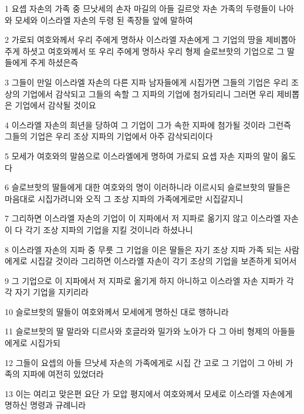 \par 1 요셉 자손의 가족 중 므낫세의 손자 마길의 아들 길르앗 자손 가족의 두령들이 나아와 모세와 이스라엘 자손의 두령 된 족장들 앞에 말하여
\par 2 가로되 여호와께서 우리 주에게 명하사 이스라엘 자손에게 그 기업의 땅을 제비뽑아 주게 하셧고 여호와께서 또 우리 주에게 명하사 우리 형제 슬로브핫의 기업으로 그 딸들에게 주게 하셨은즉
\par 3 그들이 만일 이스라엘 자손의 다른 지파 남자들에게 시집가면 그들의 기업은 우리 조상의 기업에서 감삭되고 그들의 속할 그 지파의 기업에 첨가되리니 그러면 우리 제비뽑은 기업에서 감삭될 것이요
\par 4 이스라엘 자손의 희년을 당하여 그 기업이 그가 속한 지파에 첨가될 것이라 그런즉 그들의 기업은 우리 조상 지파의 기업에서 아주 감삭되리이다
\par 5 모세가 여호와의 말씀으로 이스라엘에게 명하여 가로되 요셉 자손 지파의 말이 옳도다
\par 6 슬로브핫의 딸들에게 대한 여호와의 명이 이러하니라 이르시되 슬로브핫의 딸들은 마음대로 시집가려니와 오직 그 조상 지파의 가족에게로만 시집갈지니
\par 7 그리하면 이스라엘 자손의 기업이 이 지파에서 저 지파로 옮기지 않고 이스라엘 자손이 다 각기 조상 지파의 기업을 지킬 것이니라 하셨나니
\par 8 이스라엘 자손의 지파 중 무릇 그 기업을 이은 딸들은 자기 조상 지파 가족 되는 사람에게로 시집갈 것이라 그리하면 이스라엘 자손이 각기 조상의 기업을 보존하게 되어서
\par 9 그 기업으로 이 지파에서 저 지파로 옮기게 하지 아니하고 이스라엘 자손 지파가 각각 자기 기업을 지키리라
\par 10 슬로브핫의 딸들이 여호와께서 모세에게 명하신 대로 행하니라
\par 11 슬로브핫의 딸 말라와 디르사와 호글라와 밀가와 노아가 다 그 아비 형제의 아들들에게로 시집가되
\par 12 그들이 요셉의 아들 므낫세 자손의 가족에게로 시집 간 고로 그 기업이 그 아비 가족의 지파에 여전히 있었더라
\par 13 이는 여리고 맞은편 요단 가 모압 평지에서 여호와께서 모세로 이스라엘 자손에게 명하신 명령과 규례니라


